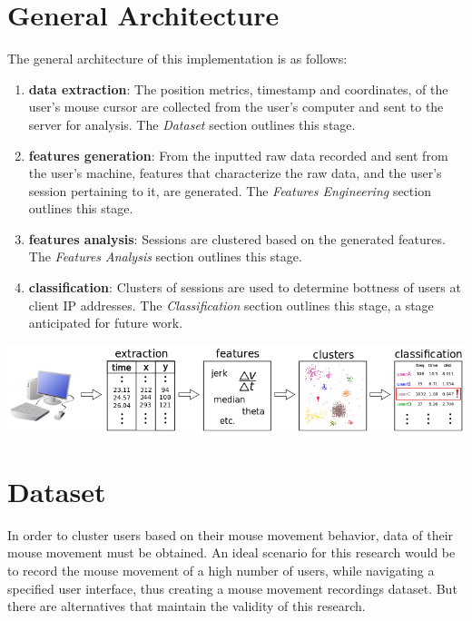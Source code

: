 \section{General Architecture}\label{sec:general-arcitecture}
The general architecture of this implementation is as follows:
\begin{enumerate}
    \item \textbf{data extraction}: The position metrics, timestamp and coordinates, of the user's mouse cursor are collected from the user's computer and sent to the server for analysis. The \textit{Dataset} section outlines this stage.
    \item \textbf{features generation}: From the inputted raw data recorded and sent from the user's machine, features that characterize the raw data, and the user's session pertaining to it, are generated. The \textit{Features Engineering} section outlines this stage.
    \item \textbf{features analysis}: Sessions are clustered based on the generated features. The \textit{Features Analysis} section outlines this stage.
    \item \textbf{classification}: Clusters of sessions are used to determine bottness of users at client IP addresses. The \textit{Classification} section outlines this stage, a stage anticipated for future work.
\end{enumerate}
\begin{center}
\includegraphics[width=1\columnwidth]{figures/general_architecture}
\end{center}

\section{Dataset}\label{sec:dataset}
In order to cluster users based on their mouse movement behavior, data of their mouse movement must be obtained.
An ideal scenario for this research would be to record the mouse movement of a high number of users, while navigating a specified user interface, thus creating a mouse movement recordings dataset.
But there are alternatives that maintain the validity of this research.

